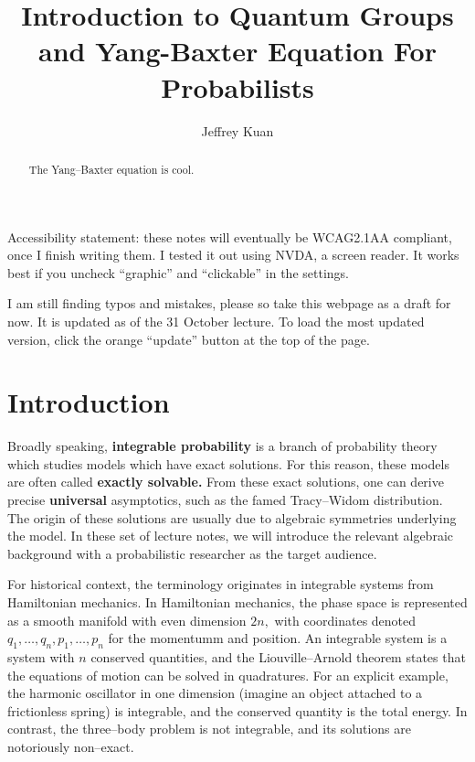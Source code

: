 \documentclass{ximera}
\author{Jeffrey Kuan}
\title{Introduction to Quantum Groups and Yang-Baxter Equation For Probabilists}
\begin{document}
\begin{abstract}
   The Yang--Baxter equation is cool. 
\end{abstract}
\maketitle


Accessibility statement: these notes will eventually be WCAG2.1AA compliant, once I finish writing them. I tested it out using NVDA, a screen reader.
It works best if you uncheck ``graphic'' and ``clickable'' in the settings. 

I am still finding typos and mistakes, please so take this webpage as a draft for now. It is updated as of
the 31 October lecture. To load the most updated version, click the orange ``update'' button
at the top of the page.

\section{Introduction}

Broadly speaking, \textbf{integrable probability} is a branch of probability theory which studies 
models which have exact solutions. For this reason, these models are often called \textbf{exactly solvable.}
From these exact solutions, one can derive precise \textbf{universal} asymptotics, such as the 
famed Tracy--Widom distribution. The origin of these solutions are usually due to algebraic symmetries 
underlying the model. In these set of lecture notes, we will introduce the relevant algebraic background
with a probabilistic researcher as the target audience. 

For historical context, the terminology originates in integrable systems from Hamiltonian mechanics.
In Hamiltonian mechanics, the phase space is represented as a smooth manifold with even dimension $2n,$
with coordinates denoted $q_1,\ldots,q_n,p_1,\ldots,p_n$ for the momentumm and position. An integrable
system is a system with $n$ conserved quantities, and the Liouville--Arnold theorem states that the 
equations of motion can be solved in quadratures. For an explicit example, the harmonic oscillator in 
one dimension (imagine an object attached to a frictionless spring) is integrable, and the conserved quantity
is the total energy. In contrast, the three--body problem is not integrable, and its solutions are 
notoriously non--exact. 
\end{document}
